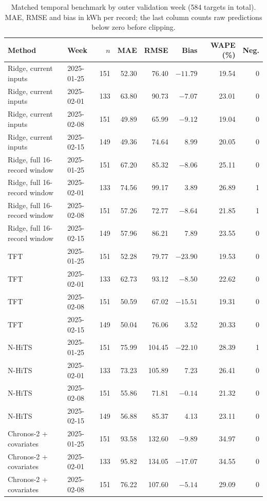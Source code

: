 \begin{table}[!htbp]\centering\scriptsize
\caption{Matched temporal benchmark by outer validation week (584 targets in total). MAE, RMSE and bias in kWh per record; the last column counts raw predictions below zero before clipping.}\label{tab:s_by_fold}
\begin{tabular}{@{}llrrrrrr@{}}\toprule
Method & Week & $n$ & MAE & RMSE & Bias & WAPE (\%) & Neg. \\\midrule
Ridge, current inputs & 2025-01-25 & 151 & 52.30 & 76.40 & $-11.79$ & 19.54 & 0 \\
Ridge, current inputs & 2025-02-01 & 133 & 63.80 & 90.73 & $-7.07$ & 23.01 & 0 \\
Ridge, current inputs & 2025-02-08 & 151 & 49.89 & 65.99 & $-9.12$ & 19.04 & 0 \\
Ridge, current inputs & 2025-02-15 & 149 & 49.36 & 74.64 & 8.99 & 20.05 & 0 \\
Ridge, full 16-record window & 2025-01-25 & 151 & 67.20 & 85.32 & $-8.06$ & 25.11 & 0 \\
Ridge, full 16-record window & 2025-02-01 & 133 & 74.56 & 99.17 & 3.89 & 26.89 & 1 \\
Ridge, full 16-record window & 2025-02-08 & 151 & 57.26 & 72.77 & $-8.64$ & 21.85 & 1 \\
Ridge, full 16-record window & 2025-02-15 & 149 & 57.96 & 86.21 & 7.89 & 23.55 & 0 \\
TFT & 2025-01-25 & 151 & 52.28 & 79.77 & $-23.90$ & 19.53 & 0 \\
TFT & 2025-02-01 & 133 & 62.73 & 93.12 & $-8.50$ & 22.62 & 0 \\
TFT & 2025-02-08 & 151 & 50.59 & 67.02 & $-15.51$ & 19.31 & 0 \\
TFT & 2025-02-15 & 149 & 50.04 & 76.06 & 3.52 & 20.33 & 0 \\
N-HiTS & 2025-01-25 & 151 & 75.99 & 104.45 & $-22.10$ & 28.39 & 1 \\
N-HiTS & 2025-02-01 & 133 & 73.23 & 105.89 & 7.23 & 26.41 & 0 \\
N-HiTS & 2025-02-08 & 151 & 55.86 & 71.81 & $-0.14$ & 21.32 & 0 \\
N-HiTS & 2025-02-15 & 149 & 56.88 & 85.37 & 4.13 & 23.11 & 0 \\
Chronos-2 + covariates & 2025-01-25 & 151 & 93.58 & 132.60 & $-9.89$ & 34.97 & 0 \\
Chronos-2 + covariates & 2025-02-01 & 133 & 95.82 & 134.05 & $-17.07$ & 34.55 & 0 \\
Chronos-2 + covariates & 2025-02-08 & 151 & 76.22 & 107.60 & $-5.14$ & 29.09 & 0 \\

\end{tabular}
\end{table}
